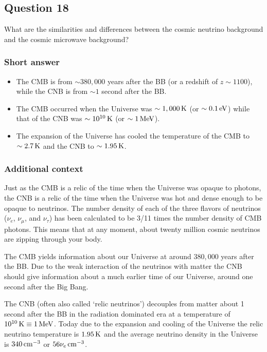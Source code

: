 \documentclass[a4paper,11pt]{article}
\begin{document}
%
%

\newpage
\subsection{Question 18}

What are the similarities and differences between the cosmic neutrino background and the cosmic microwave background?

\subsubsection{Short answer}

\begin{itemize}
    \item The CMB is from $\sim380,000$ years after the BB (or a redshift of $z\sim1100$), while the CNB is from $\sim1$ second after the BB.
    \item The CMB occurred when the Universe was $\sim1,000\,{\rm K}$ (or $\sim0.1\,{\rm eV}$) while that of the CNB was $\sim10^{10}\,{\rm K}$ (or $\sim1\,{\rm MeV}$).
    \item The expansion of the Universe has cooled the temperature of the CMB to $\sim2.7\,{\rm K}$ and the CNB to $\sim1.95\,{\rm K}$.
\end{itemize}

\subsubsection{Additional context}

Just as the CMB is a relic of the time when the Universe was opaque to photons, the CNB is a relic of the time when the Universe was hot and dense enough to be opaque to neutrinos. The number density of each of the three flavors of neutrinos ($\nu_e$, $\nu_\mu$, and $\nu_\tau$) has been calculated to be 3/11 times the number density of CMB photons. This means that at any moment, about twenty million cosmic neutrinos are zipping through your body.

{\noindent}The CMB yields information about our Universe at around $380,000$ years after the BB. Due to the weak interaction of the neutrinos with matter the CNB should give information about a much earlier time of our Universe, around one second after the Big Bang.

{\noindent}The CNB (often also called `relic neutrinos') decouples from matter about 1 second after the BB in the radiation dominated era at a temperature of $10^{10}\,{\rm K}\equiv1\,{\rm MeV}$. Today due to the expansion and cooling of the Universe the relic neutrino temperature is $1.95\,{\rm K}$ and the average neutrino density in the Universe is $340\,{\rm cm^{-3}}$ or $56\nu_e\,{\rm cm^{-3}}$.
\end{document}
